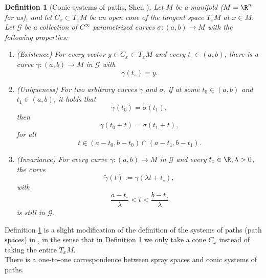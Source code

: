 \documentclass{article}
\numberwithin{equation}{section}
\theoremstyle{plain}
\newtheorem{definition}[theorem]{Definition}
\begin{document}
 \begin{definition}[Conic systems of paths, Shen \cite{Shen01}]\label{250801defi1_17} Let $M$ be a manifold ($M=\R^n$ for us), and let $C_x\subset T_x M$ be an open cone of the tangent space $T_x M$ at $x\in M$.  
 Let $\mathcal{G}$ be a collection of $C^{\infty}$ parametrized curves $\sigma: (a, b)\to M$ with the following properties:
 \begin{enumerate}
 \item[(i)] (Existence) For every vector $y\in C_x\subset T_x M$ and every $t_{\circ}\in (a, b)$, there is a curve $\gamma: (a, b)\to M$ in $\mathcal{G}$ with 
 \begin{equation}
 \dot {\gamma}(t_{\circ})=y.
 \end{equation}
 \item[(ii)] (Uniqueness) For two arbitrary curves $\gamma$ and $\sigma$, if at some $t_0\in (a, b)$ and $t_1\in (a, b)$, it holds that 
 \begin{equation}
 \dot{\gamma}(t_0)=\dot{\sigma}(t_1),
 \end{equation}
 then 
 \begin{equation}
 \gamma(t_0+ t)= \sigma(t_1+ t),
 \end{equation}
 for all 
 \begin{equation}
 t\in (a-t_0, b-t_0)\cap (a-t_1, b-t_1).
 \end{equation}
 \item[(iii)] (Invariance) For every curve $\gamma: (a, b)\to M$ in $\mathcal{G}$ and every $t_{\circ}\in \R, \lambda>0$, the curve 
 \begin{equation}
 \widetilde{\gamma}(t):= 
 \gamma(\lambda t+ t_{\circ}),
 \end{equation}
 with 
 \begin{equation}
 \frac{a-t_{\circ}}{\lambda}< t< \frac{b-t_{\circ}}{\lambda}
 \end{equation}
 is still in $\mathcal{G}$. 
 \end{enumerate}

 \end{definition}

 Definition \ref{250801defi1_17} is a slight modification of the definition of the systems of paths (path spaces) in 
   \cite[Section 4.1]{Shen01}, in the sense that in Definition \ref{250801defi1_17} we only take a cone $C_x$ instead of taking the entire $T_x M$. \\



There is a one-to-one correspondence between spray spaces and conic systems of paths. 
\end{document}
